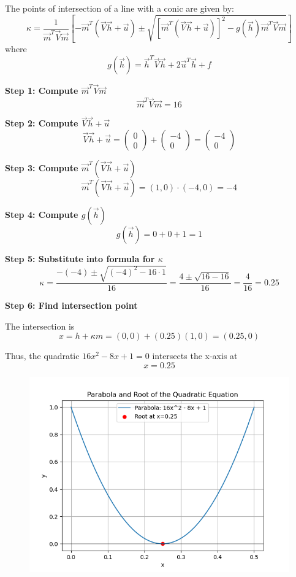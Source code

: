 \documentclass[journal,12pt,onecolumn]{IEEEtran}
\begin{document}
The points of intersection of a line with a conic are given by:
\[
\kappa = \frac{1}{\vec{m}^T\vec{V}\vec{m}}
\left[
-\vec{m}^T(\vec{V}\vec{h}+\vec{u}) \pm 
\sqrt{
\left[
\vec{m}^T(\vec{V}\vec{h}+\vec{u})
\right]^2 - g(\vec{h})\vec{m}^T\vec{V}\vec{m}
}
\right]
\]
where
\[
g(\vec{h}) = \vec{h}^T\vec{V}\vec{h} + 2\vec{u}^T\vec{h} + f
\]

\textbf{Step 1: Compute $\vec{m}^T\vec{V}\vec{m}$}
\[
\vec{m}^T\vec{V}\vec{m} = 16
\]

\textbf{Step 2: Compute $\vec{V}\vec{h} + \vec{u}$}
\[
\vec{V}\vec{h} + \vec{u} = \begin{pmatrix} 0 \\ 0 \end{pmatrix} + \begin{pmatrix} -4 \\ 0 \end{pmatrix} = \begin{pmatrix} -4 \\ 0 \end{pmatrix}
\]

\textbf{Step 3: Compute $\vec{m}^T(\vec{V}\vec{h}+\vec{u})$}
\[
\vec{m}^T(\vec{V}\vec{h}+\vec{u}) = (1,0) \cdot (-4,0) = -4
\]

\textbf{Step 4: Compute $g(\vec{h})$}
\[
g(\vec{h}) = 0 + 0 + 1 = 1
\]

\textbf{Step 5: Substitute into formula for $\kappa$}
\[
\kappa = \frac{-(-4) \pm \sqrt{(-4)^2 - 16 \cdot 1}}{16}
= \frac{4 \pm \sqrt{16-16}}{16}
= \frac{4}{16}
= 0.25
\]

\textbf{Step 6: Find intersection point}

The intersection is 
\[
x = h + \kappa m = (0,0) + (0.25)(1,0) = (0.25, 0)
\]

Thus, the quadratic $16x^2 - 8x + 1 = 0$ intersects the x-axis at
\[
\boxed{x = 0.25}
\]
      \begin{frame}[fragile]
    \begin{figure}[H]
    \centering
    \includegraphics[width = 0.6\columnwidth]{figs/img.png}
    \caption*{}
    \label{figs}
\end{figure}
\end{frame}
\end{document}
